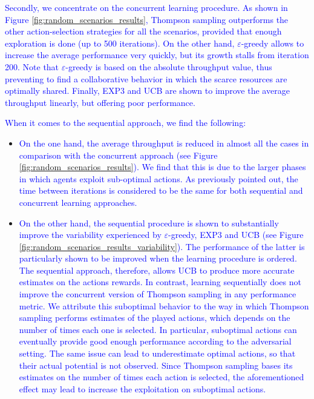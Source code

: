 \documentclass[preprint,12pt]{elsarticle}
\begin{document}
	\textcolor{blue}{Secondly, we concentrate on the concurrent learning procedure. As shown in Figure \ref{fig:random_scenarios_results}, Thompson sampling outperforms the other action-selection strategies for all the scenarios, provided that enough exploration is done (up to 500 iterations). On the other hand, $\varepsilon$-greedy allows to increase the average performance very quickly, but its growth stalls from iteration 200. Note that $\varepsilon$-greedy is based on the absolute throughput value, thus preventing to find a collaborative behavior in which the scarce resources are optimally shared. Finally, EXP3 and UCB are shown to improve the average throughput linearly, but offering poor performance.}
	
	\textcolor{blue}{When it comes to the sequential approach, we find the following:}
	\begin{itemize}
		\item \textcolor{blue}{On the one hand, the average throughput is reduced in almost all the cases in comparison with the concurrent approach (see Figure \ref{fig:random_scenarios_results}). We find that this is due to the larger phases in which agents exploit sub-optimal actions. As previously pointed out, the time between iterations is considered to be the same for both sequential and concurrent learning approaches.}
		\item \textcolor{blue}{On the other hand, the sequential procedure is shown to substantially improve the variability experienced by $\varepsilon$-greedy, EXP3 and UCB (see Figure \ref{fig:random_scenarios_results_variability}). The performance of the latter is particularly shown to be improved when the learning procedure is ordered. The sequential approach, therefore, allows UCB to produce more accurate estimates on the actions rewards. In contrast, learning sequentially does not improve the concurrent version of Thompson sampling in any performance metric. We attribute this suboptimal behavior to the way in which Thompson sampling performs estimates of the played actions, which depends on the number of times each one is selected. In particular, suboptimal actions can eventually provide good enough performance according to the adversarial setting. The same issue can lead to underestimate optimal actions, so that their actual potential is not observed. Since Thompson sampling bases its estimates on the number of times each action is selected, the aforementioned effect may lead to increase the exploitation on suboptimal actions.}
	\end{itemize}
	
\end{document}

